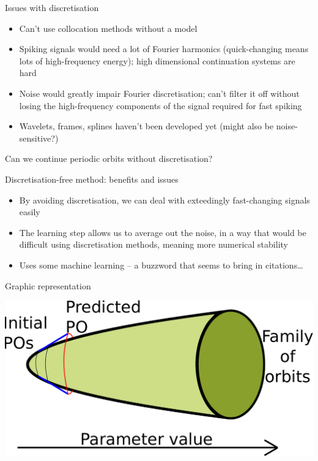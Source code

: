 \documentclass[presentation]{beamer}
\begin{document}
\begin{frame}[label={sec:orgda79251}]{Issues with discretisation}
\begin{itemize}
\item Can't use collocation methods without a model
\item Spiking signals would need a lot of Fourier harmonics (quick-changing means lots of high-frequency energy); high dimensional continuation systems are hard
\item Noise would greatly impair Fourier discretisation; can't filter it off without losing the high-frequency components of the signal required for fast spiking
\item Wavelets, frames, splines haven't been developed yet (might also be noise-sensitive?)
\end{itemize}

Can we continue periodic orbits without discretisation?
\end{frame}

\begin{frame}[label={sec:orgb69177e}]{Discretisation-free method: benefits and issues}
\begin{itemize}
\item By avoiding discretisation, we can deal with exteedingly fast-changing signals easily
\item The learning step allows us to average out the noise, in a way that would be difficult using discretisation methods, meaning more numerical stability
\item Uses some machine learning -- a buzzword that seems to bring in citations\ldots{}
\end{itemize}
\end{frame}

\begin{frame}[label={sec:org0322a0c}]{Graphic representation}
\begin{center}
\includegraphics[width=.9\linewidth]{./po_family.pdf}
\end{center}
\end{frame}
\end{document}
